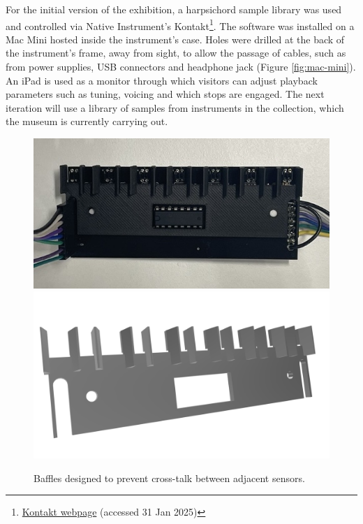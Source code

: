 For the initial version of the exhibition, a harpsichord sample library was used and controlled via Native Instrument's Kontakt\footnote{\href{https://www.native-instruments.com/en/products/komplete/samplers/kontakt-8/?srsltid=AfmBOorKUf43SoIxGBS2-GnXmKHHkgcfcfWRskpweDhLSG3FiF0qrf2w}{Kontakt webpage} (accessed 31 Jan 2025)}. The software was installed on a Mac Mini hosted inside the instrument's case. Holes were drilled at the back of the instrument's frame, away from sight, to allow the passage of cables, such as from power supplies, USB connectors and headphone jack (Figure \ref{fig:mac-mini}). 
An iPad is used as a monitor through which visitors can adjust playback parameters such as tuning, voicing and which stops are engaged. The next iteration will use a library of samples from instruments in the collection, which the museum is currently carrying out.

\begin{figure}[!b]
    \centering
    \includegraphics[width=\linewidth,trim={0 1.5cm 0 1.5cm},clip]{src/images/sensor-board-w-baffles.jpeg}
    \\
    \includegraphics[width=0.8\linewidth,trim={0 2cm 0 2.5cm},clip]{src/images/baffles.png}
    \caption{Baffles designed to prevent cross-talk between adjacent sensors.}
    \Description{}
    \label{fig:baffles}
\end{figure}




